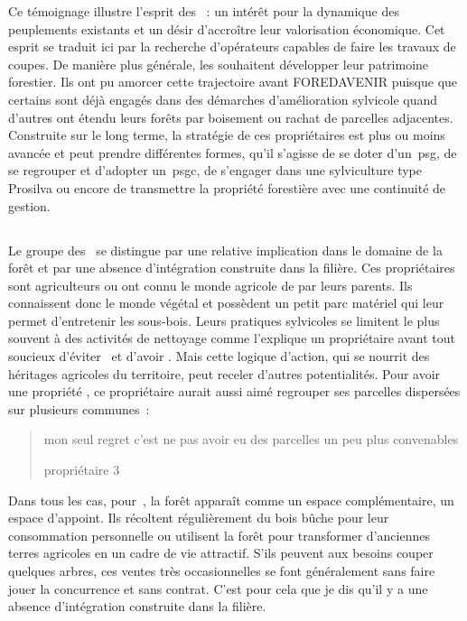 \documentclass[12pt]{report}
\newcommand\indexp[1]{#1\index{#1}}
\begin{document}
Ce témoignage illustre l’esprit des ~: un intérêt
pour la dynamique des peuplements existants et un désir d’accroître leur
valorisation économique. Cet esprit se traduit ici par la recherche d’opérateurs
capables de faire les travaux de coupes. De manière plus générale, les
 souhaitent développer leur patrimoine
forestier. Ils ont pu amorcer cette trajectoire avant FOREDAVENIR  puisque que
certains sont déjà engagés dans des démarches d’amélioration sylvicole quand
d’autres ont étendu leurs forêts par boisement ou rachat de parcelles adjacentes.
Construite sur le long terme, la stratégie de ces propriétaires est plus ou
moins avancée et peut prendre différentes formes, qu’il s’agisse de se doter
d’un~\gls{psg}, de se regrouper et d’adopter un~\gls{psgc}, de s’engager dans une
sylviculture type \indexp{Prosilva}  ou encore de transmettre la propriété forestière
avec une continuité de gestion.

\subsection{}

Le groupe des~ se distingue par une relative implication dans le
domaine de la forêt et par une absence d’intégration construite dans la filière.
Ces propriétaires sont agriculteurs ou ont connu le monde agricole de par leurs
parents. Ils connaissent donc le monde végétal et possèdent un petit parc
matériel qui leur permet d’entretenir les sous-bois. Leurs pratiques sylvicoles
se limitent le plus souvent à des activités de nettoyage comme l’explique un
propriétaire avant tout soucieux d’éviter~ et d’avoir
. Mais cette logique d’action, qui se nourrit des héritages
agricoles du territoire, peut receler d’autres potentialités. Pour avoir une
propriété , ce propriétaire aurait aussi aimé
regrouper ses parcelles dispersées sur plusieurs communes~: \blockquote[propriétaire 3]{mon seul regret
c’est ne pas avoir eu des parcelles un peu plus convenables}
Dans tous les cas, pour~, la forêt apparaît comme un espace
complémentaire, un espace d’appoint. Ils récoltent régulièrement du bois bûche
pour leur consommation personnelle ou utilisent la forêt pour transformer
d’anciennes terres agricoles en un cadre de vie attractif.  S’ils peuvent aux
besoins couper quelques arbres, ces ventes très occasionnelles se font
généralement sans faire jouer la concurrence et sans contrat. C’est pour cela
que je dis qu’il y a une absence d’intégration construite dans la filière. 
\end{document}
